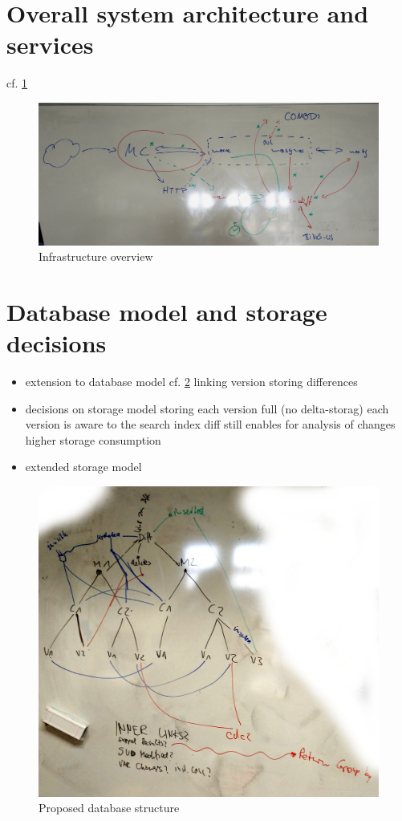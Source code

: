 \section{Overall system architecture and services}
cf. \ref{fig:system-overview}
\begin{figure}
	\includegraphics[width=\textwidth]{resources/system_overview.jpg}
	\caption{Infrastructure overview }
	\label{fig:system-overview}
\end{figure}

\section{Database model and storage decisions}
\begin{itemize}
\item extension to database model cf. \ref{fig:db-model}
	\subitem linking version
	\subitem storing differences
\item decisions on storage model
	\subitem storing each version full (no delta-storag)
	\subitem each version is aware to the search index
	\subitem diff still enables for analysis of changes
	\subitem higher storage consumption
\item extended storage model
\end{itemize}
\begin{figure}
	\includegraphics[width=\textwidth]{resources/db_structure.jpg}
	\caption{Proposed database structure}
	\label{fig:db-model}
\end{figure}